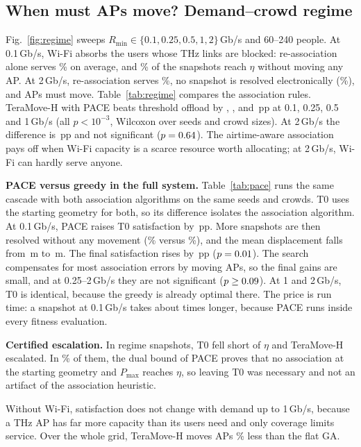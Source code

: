 \documentclass[conference]{IEEEtran}
\newcommand{\Rmin}{R_{\min}}
\newcommand{\Pmax}{P_{\max}}
\begin{document}
\subsection{When must APs move? Demand--crowd regime}\label{sec:regime}
Fig.~\ref{fig:regime} sweeps $\Rmin\in\{0.1,0.25,0.5,1,2\}$\,Gb/s and 60--240 people.
At 0.1\,Gb/s, Wi-Fi absorbs the users whose THz links are blocked: re-association alone serves \RegimeTzeroLow\% on average, and \RegimeElecLowDemand\% of the snapshots reach $\eta$ without moving any AP.
At 2\,Gb/s, re-association serves \RegimeTzeroHigh\%, no snapshot is resolved electronically (\RegimeElecHighDemand\%), and APs must move.
Table~\ref{tab:regime} compares the association rules.
TeraMove-H with PACE beats threshold offload by \GapVsNaiveA, \GapVsNaiveB, \GapVsNaiveC{} and \GapVsNaiveD\,pp at 0.1, 0.25, 0.5 and 1\,Gb/s (all $p<10^{-3}$, Wilcoxon over seeds and crowd sizes).
At 2\,Gb/s the difference is \GapVsNaiveE\,pp and not significant ($p=0.64$).
The airtime-aware association pays off when Wi-Fi capacity is a scarce resource worth allocating; at 2\,Gb/s, Wi-Fi can hardly serve anyone.

\textbf{PACE versus greedy in the full system.}
Table~\ref{tab:pace} runs the same cascade with both association algorithms on the same seeds and crowds.
T0 uses the starting geometry for both, so its difference isolates the association algorithm.
At 0.1\,Gb/s, PACE raises T0 satisfaction by \PaceTzeroGainA\,pp.
More snapshots are then resolved without any movement (\PaceElecA\% versus \GreedyElecA\%), and the mean displacement falls from \GreedyDispA\,m to \PaceDispA\,m.
The final satisfaction rises by \PaceSGainA\,pp ($p=0.01$).
The search compensates for most association errors by moving APs, so the final gains are small, and at 0.25--2\,Gb/s they are not significant ($p\ge0.09$).
At 1 and 2\,Gb/s, T0 is identical, because the greedy is already optimal there.
The price is run time: a snapshot at 0.1\,Gb/s takes about \PaceRtRatioA{} times longer, because PACE runs inside every fitness evaluation.

\textbf{Certified escalation.}
In \EscN{} regime snapshots, T0 fell short of $\eta$ and TeraMove-H escalated.
In \EscCertPct\% of them, the dual bound of PACE proves that no association at the starting geometry and $\Pmax$ reaches $\eta$, so leaving T0 was necessary and not an artifact of the association heuristic.

Without Wi-Fi, satisfaction does not change with demand up to 1\,Gb/s, because a THz AP has far more capacity than its users need and only coverage limits service.
Over the whole grid, TeraMove-H moves APs \RegimeDispRatio\% less than the flat GA.
\end{document}
